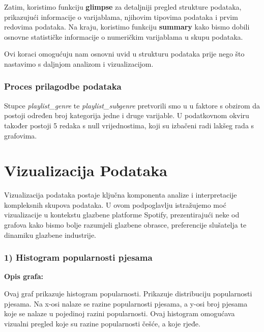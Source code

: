 		Zatim, koristimo funkciju \textbf{glimpse} za detaljniji pregled strukture podataka, prikazujući informacije o varijablama, njihovim tipovima podataka i prvim redovima podataka. Na kraju, koristimo funkciju \textbf{summary} kako bismo dobili osnovne statističke informacije o numeričkim varijablama u skupu podataka.
		
		Ovi koraci omogućuju nam osnovni uvid u strukturu podataka prije nego što nastavimo s daljnjom analizom i vizualizacijom.

	
	\subsubsection{Proces prilagodbe podataka}
	Stupce \textit{playlist\_genre} te \textit{playlist\_subgenre} pretvorili smo u u faktore s obzirom da postoji određen broj kategorija jedne i druge varijable. U podatkovnom okviru također postoji 5 redaka s null vrijednostima, koji su izbačeni radi lakšeg rada s grafovima.
	


\clearpage
\section{Vizualizacija Podataka}
	Vizualizacija podataka postaje ključna komponenta analize i interpretacije kompleksnih skupova podataka. 
	U ovom podpoglavlju istražujemo moć vizualizacije u kontekstu glazbene platforme Spotify, prezentirajući neke od grafova kako bismo bolje razumjeli glazbene obrasce, preferencije slušatelja te dinamiku glazbene industrije.
	
	\subsubsection{1) Histogram popularnosti pjesama}
	
	\textbf{Opis grafa:}
	
	Ovaj graf prikazuje histogram popularnosti. Prikazuje distribuciju popularnosti pjesama. Na x-osi nalaze se razine popularnosti pjesama, a y-osi broj pjesama koje se nalaze u pojedinoj razini popularnosti.
	Ovaj histogram omogućava vizualni pregled koje su razine popularnosti češće, a koje rjeđe. 

